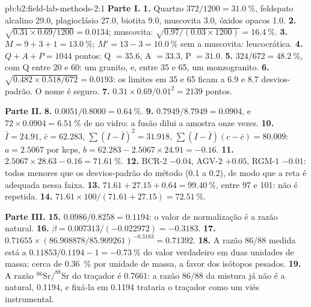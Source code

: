 \begin{solution}{pb:b2:field-lab-methods-2:1}
\noindent\textbf{Parte I.}
\textbf{1.} Quartzo $372/1200 = \qty{31.0}{\percent}$, feldspato alcalino 29.0, plagioclásio 27.0, biotita
9.0, muscovita 3.0, óxidos opacos 1.0.
\textbf{2.} $\sqrt{0.31 \times 0.69/1200} = 0.0134$; muscovita: $\sqrt{0.97/(0.03 \times 1200)} =
\qty{16.4}{\percent}$.
\textbf{3.} $M = 9 + 3 + 1 = \qty{13.0}{\percent}$; $M' = 13 - 3 = \qty{10.0}{\percent}$ sem a
muscovita: leucocrática.
\textbf{4.} $Q + A + P = 1044$ pontos: Q $= 35.6$, A $= 33.3$, P $= 31.0$.
\textbf{5.} $324/672 = \qty{48.2}{\percent}$, com Q entre 20 e 60: um granito, e, entre 35 e
65, um monzogranito.
\textbf{6.} $\sqrt{0.482 \times 0.518/672} = 0.0193$: os limites em 35 e 65 ficam a 6.9 e 8.7
desvios-padrão. O nome é seguro.
\textbf{7.} $0.31 \times 0.69/0.01^2 = 2139$ pontos.

\noindent\textbf{Parte II.}
\textbf{8.} $0.0051/0.8000 = \qty{0.64}{\percent}$.
\textbf{9.} $0.7949/8.7949 = 0.0904$, e $72 \times 0.0904 = \qty{6.51}{\percent}$ de  no
vidro: a fusão dilui a amostra onze vezes.
\textbf{10.} $\bar I = 24.91$, $\bar c = 62.283$, $\sum(I - \bar I)^2 = 31.918$, $\sum(I - \bar I)(c -
\bar c) = 80.009$: $a = 2.5067$ por kcps, $b = 62.283 - 2.5067 \times 24.91 = -0.16$.
\textbf{11.} $2.5067 \times 28.63 - 0.16 = \qty{71.61}{\percent}$.
\textbf{12.} BCR-2 $-0.04$, AGV-2 $+0.05$, RGM-1 $-0.01$: todos menores que os desvios-padrão
do método (0.1 a 0.2), de modo que a reta é adequada nessa faixa.
\textbf{13.} $71.61 + 27.15 + 0.64 = \qty{99.40}{\percent}$, entre 97 e 101: não é repetida.
\textbf{14.} $71.61 \times 100/(71.61 + 27.15) = \qty{72.51}{\percent}$.

\noindent\textbf{Parte III.}
\textbf{15.} $0.0986/0.8258 = 0.1194$: o valor de normalização é a razão natural.
\textbf{16.} $\beta = 0.007313/(-0.022972) = -0.3183$.
\textbf{17.} $0.71655 \times (86.908878/85.909261)^{-0.3183} = 0.71392$.
\textbf{18.} A razão 86/88 medida está a $0.11853/0.1194 - 1 = \qty{-0.73}{\percent}$ do valor verdadeiro
em duas unidades de massa: cerca de \qty{0.36}{\percent} por unidade de massa, a favor dos isótopos pesados.
\textbf{19.} A razão $^{86}\mathrm{Sr}/^{88}\mathrm{Sr}$ do traçador é 0.7661: a razão 86/88 da mistura já não é
a natural, 0.1194, e fixá-la em 0.1194 trataria o traçador como um viés instrumental.


\end{solution}
